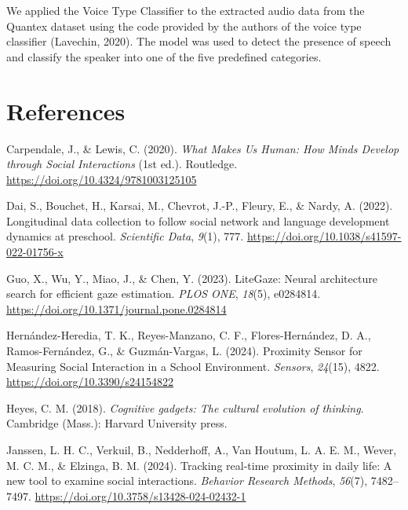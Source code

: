 \documentclass[
  man,floatsintext]{apa6}
\newlength{\cslhangindent}
\newenvironment{CSLReferences}[2] %
 {\begin{list}{}{%
  \setlength{\itemindent}{0pt}
  \setlength{\leftmargin}{0pt}
  \setlength{\parsep}{0pt}
  \ifodd #1
   \setlength{\leftmargin}{\cslhangindent}
   \setlength{\itemindent}{-1\cslhangindent}
  \fi
  \setlength{\itemsep}{#2\baselineskip}}}
 {\end{list}}
\begin{document}
We applied the Voice Type Classifier to the extracted audio data from the Quantex dataset using the code provided by the authors of the voice type classifier (Lavechin, 2020). The model was used to detect the presence of speech and classify the speaker into one of the five predefined categories.

\newpage

\section{References}\label{references-1}

\begingroup
\setlength{\parindent}{-0.5in}
\setlength{\leftskip}{0.5in}

\label{refs}
\begin{CSLReferences}{1}{0}
Carpendale, J., \& Lewis, C. (2020). \emph{What {Makes Us Human}: {How Minds Develop} through {Social Interactions}} (1st ed.). Routledge. \url{https://doi.org/10.4324/9781003125105}

Dai, S., Bouchet, H., Karsai, M., Chevrot, J.-P., Fleury, E., \& Nardy, A. (2022). Longitudinal data collection to follow social network and language development dynamics at preschool. \emph{Scientific Data}, \emph{9}(1), 777. \url{https://doi.org/10.1038/s41597-022-01756-x}

Guo, X., Wu, Y., Miao, J., \& Chen, Y. (2023). {LiteGaze}: {Neural} architecture search for efficient gaze estimation. \emph{PLOS ONE}, \emph{18}(5), e0284814. \url{https://doi.org/10.1371/journal.pone.0284814}

Hernández-Heredia, T. K., Reyes-Manzano, C. F., Flores-Hernández, D. A., Ramos-Fernández, G., \& Guzmán-Vargas, L. (2024). Proximity {Sensor} for {Measuring Social Interaction} in a {School Environment}. \emph{Sensors}, \emph{24}(15), 4822. \url{https://doi.org/10.3390/s24154822}

Heyes, C. M. (2018). \emph{Cognitive gadgets: The cultural evolution of thinking}. Cambridge (Mass.): Harvard University press.

Janssen, L. H. C., Verkuil, B., Nedderhoff, A., Van Houtum, L. A. E. M., Wever, M. C. M., \& Elzinga, B. M. (2024). Tracking real-time proximity in daily life: {A} new tool to examine social interactions. \emph{Behavior Research Methods}, \emph{56}(7), 7482--7497. \url{https://doi.org/10.3758/s13428-024-02432-1}


\end{CSLReferences}
\end{document}
